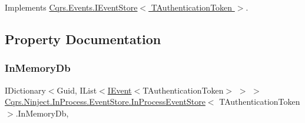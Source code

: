 Implements \hyperlink{interfaceCqrs_1_1Events_1_1IEventStore_a92e768243d6602d09b786bbd06811ce6}{Cqrs.\+Events.\+I\+Event\+Store$<$ T\+Authentication\+Token $>$}.



\subsection{Property Documentation}
\mbox{\label{classCqrs_1_1Ninject_1_1InProcess_1_1EventStore_1_1InProcessEventStore_a189745cc74bcc2f0caac135c87296242}} 
\subsubsection{\texorpdfstring{In\+Memory\+Db}{InMemoryDb}}
{\footnotesize\ttfamily I\+Dictionary$<$Guid, I\+List$<$\hyperlink{interfaceCqrs_1_1Events_1_1IEvent}{I\+Event}$<$T\+Authentication\+Token$>$ $>$ $>$ \hyperlink{classCqrs_1_1Ninject_1_1InProcess_1_1EventStore_1_1InProcessEventStore}{Cqrs.\+Ninject.\+In\+Process.\+Event\+Store.\+In\+Process\+Event\+Store}$<$ T\+Authentication\+Token $>$.In\+Memory\+Db\hspace{0.3cm}{\ttfamily [get]}, {\ttfamily [protected]}}

